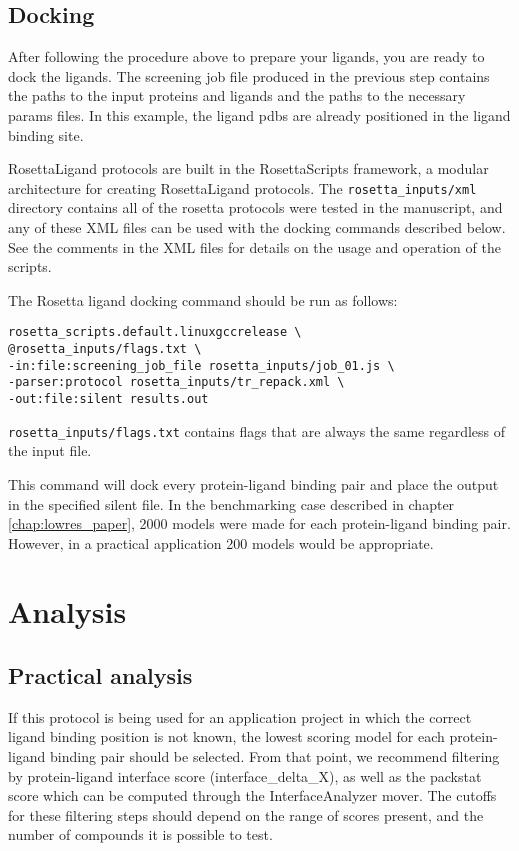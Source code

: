 \subsection{Docking}

After following the procedure above to prepare your ligands, you are ready to dock the ligands.
The screening job file produced in the previous step contains the paths to the input proteins and ligands and the paths to the necessary params files.
In this example, the ligand pdbs are already positioned in the ligand binding site.

RosettaLigand protocols are built in the RosettaScripts framework, a modular architecture for creating RosettaLigand protocols.
The \texttt{rosetta\_inputs/xml} directory contains all of the rosetta protocols were tested in the manuscript, and any of these \ac{XML} files can be used with the docking commands described below. 
See the comments in the \ac{XML} files for details on the usage and operation of the scripts. 

The Rosetta ligand docking command should be run as follows:

\begin{verbatim}
rosetta_scripts.default.linuxgccrelease \
@rosetta_inputs/flags.txt \
-in:file:screening_job_file rosetta_inputs/job_01.js \
-parser:protocol rosetta_inputs/tr_repack.xml \
-out:file:silent results.out
\end{verbatim}

\texttt{rosetta\_inputs/flags.txt} contains flags that are always the same regardless of the input file.

This command will dock every protein-ligand binding pair and place the output in the specified silent file.
In the benchmarking case described in chapter \ref{chap:lowres_paper}, 2000 models were made for each protein-ligand binding pair. 
However, in a practical application 200 models would be appropriate.

\section{Analysis}

\subsection{Practical analysis}

If this protocol is being used for an application project in which the correct ligand binding position is not known, the lowest scoring model for each protein-ligand binding pair should be selected.
From that point, we recommend filtering by protein-ligand interface score (interface\_delta\_X), as well as the packstat score \citep{Sheffler:2009bd} which can be computed through the InterfaceAnalyzer mover.
The cutoffs for these filtering steps should depend on the range of scores present, and the number of compounds it is possible to test.

